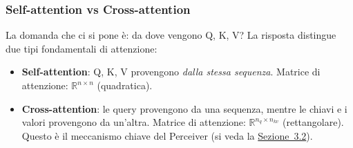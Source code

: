 \documentclass[12pt,a4paper]{article}
\begin{document}
\subsubsection{Self-attention vs Cross-attention} \label{sec:self_vs_cross}

La domanda che ci si pone \`e: da dove vengono Q, K, V? La risposta distingue due tipi fondamentali di attenzione:

\begin{itemize}[leftmargin=*]
    \item \textbf{Self-attention}: Q, K, V provengono \emph{dalla stessa sequenza}. Matrice di attenzione: $\mathbb{R}^{n \times n}$ (quadratica).

    \item \textbf{Cross-attention}: le query provengono da una sequenza, mentre le chiavi e i valori provengono da un'altra. Matrice di attenzione: $\mathbb{R}^{n_q \times n_{kv}}$ (rettangolare). Questo \`e il meccanismo chiave del Perceiver (si veda la \hyperref[sec:cross_attention]{Sezione~3.2}).
\end{itemize}
\end{document}
